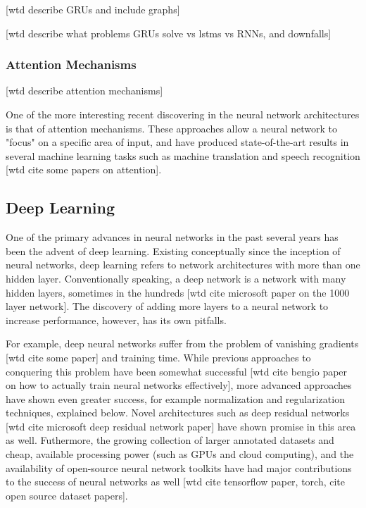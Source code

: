 \documentclass[a4paper,11pt,twoside]{scrbook}
\begin{document}
	

[wtd describe GRUs and include graphs]

[wtd describe what problems GRUs solve vs lstms vs RNNs, and downfalls]

\subsubsection{Attention Mechanisms}

[wtd describe attention mechanisms]

One of the more interesting recent discovering in the neural network architectures is that of attention mechanisms.  These approaches allow a neural network to "focus" on a specific area of input, and have produced state-of-the-art results in several machine learning tasks such as machine translation and speech recognition [wtd cite some papers on attention].

\subsection{Deep Learning}

One of the primary advances in neural networks in the past several years has been the advent of deep learning.  Existing conceptually since the inception of neural networks, deep learning refers to network architectures with more than one hidden layer.  Conventionally speaking, a deep network is a network with many hidden layers, sometimes in the hundreds [wtd cite microsoft paper on the 1000 layer network].  The discovery of adding more layers to a neural network to increase performance, however, has its own pitfalls.  

For example, deep neural networks suffer from the problem of vanishing gradients [wtd cite some paper] and training time.  While previous approaches to conquering this problem have been somewhat successful [wtd cite bengio paper on how to actually train neural networks effectively], more advanced approaches have shown even greater success, for example normalization and regularization techniques, explained below.  Novel architectures such as deep residual networks [wtd cite microsoft deep residual network paper] have shown promise in this area as well.  Futhermore, the growing collection of larger annotated datasets and cheap, available processing power (such as GPUs and cloud computing), and the availability of open-source neural network toolkits have had major contributions to the success of neural networks as well [wtd cite tensorflow paper, torch, cite open source dataset papers].
\end{document}
